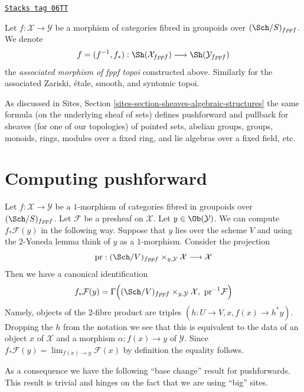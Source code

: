 \begin{definition}[Morphism]
\label{stacks-sheaves-definition-morphism}
\href{https://stacks.math.columbia.edu/tag/06TT}{\texttt{Stacks tag 06TT}}

Let $f : \mathcal{X} \to \mathcal{Y}$ be a morphism of categories
fibred in groupoids over $(\Sch/S)_{fppf}$. We denote
$$
f = (f^{-1}, f_*) :
\Sh(\mathcal{X}_{fppf})
\longrightarrow
\Sh(\mathcal{Y}_{fppf})
$$
the {\it associated morphism of fppf topoi} constructed above.
Similarly for the associated Zariski, \'etale, smooth, and syntomic topoi.
\end{definition}

As discussed in
Sites, Section \ref{sites-section-sheaves-algebraic-structures}
the same formula (on the underlying sheaf of sets) defines
pushforward and pullback for sheaves (for one of our topologies)
of pointed sets, abelian groups, groups, monoids, rings, modules
over a fixed ring, and lie algebras over a fixed field, etc.

\section{Computing pushforward}
\label{stacks-sheaves-section-pushforward}
Let $f : \mathcal{X} \to \mathcal{Y}$ be a $1$-morphism of categories
fibred in groupoids over $(\Sch/S)_{fppf}$. Let $\mathcal{F}$
be a presheaf on $\mathcal{X}$. Let $y \in \Ob(\mathcal{Y})$.
We can compute $f_*\mathcal{F}(y)$ in the following way. Suppose that
$y$ lies over the scheme $V$ and using the $2$-Yoneda lemma think
of $y$ as a $1$-morphism. Consider the projection
$$
\text{pr} :
(\Sch/V)_{fppf} \times_{y, \mathcal{Y}} \mathcal{X}
\longrightarrow
\mathcal{X}
$$
Then we have a canonical identification
\begin{equation}
\label{equation-pushforward}
f_*\mathcal{F}(y) = \Gamma\Big(
(\Sch/V)_{fppf} \times_{y, \mathcal{Y}} \mathcal{X},
\ \text{pr}^{-1}\mathcal{F}\Big)
\end{equation}
Namely, objects of the $2$-fibre product are triples
$(h : U \to V, x, f(x) \to h^*y)$. Dropping the $h$ from the
notation we see that this is equivalent to the data of an object
$x$ of $\mathcal{X}$ and a morphism $\alpha : f(x) \to y$ of $\mathcal{Y}$.
Since $f_*\mathcal{F}(y) = \lim_{f(x) \to y} \mathcal{F}(x)$ by definition
the equality follows.

\medskip\noindent
As a consequence we have the following ``base change'' result for
pushforwards. This result is trivial and hinges on the fact that
we are using ``big'' sites.

